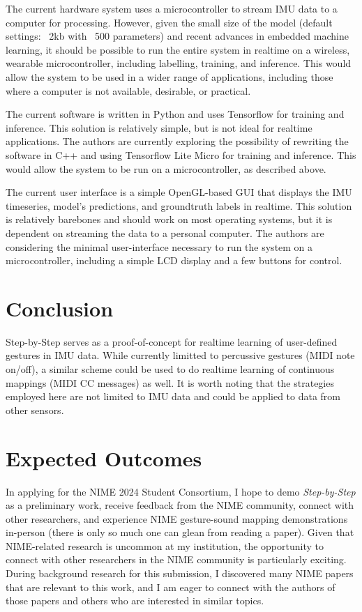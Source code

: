 \documentclass{nime-alternate} %
\begin{document}
The current hardware system uses a microcontroller to stream IMU data to a computer for processing. However, given the small size of the model (default settings: ~2kb with ~500 parameters) and recent advances in embedded machine learning, it should be possible to run the entire system in realtime on a wireless, wearable microcontroller, including labelling, training, and inference. This would allow the system to be used in a wider range of applications, including those where a computer is not available, desirable, or practical. 

The current software is written in Python and uses Tensorflow for training and inference. This solution is relatively simple, but is not ideal for realtime applications. The authors are currently exploring the possibility of rewriting the software in C++ and using Tensorflow Lite Micro for training and inference. This would allow the system to be run on a microcontroller, as described above.

The current user interface is a simple OpenGL-based GUI that displays the IMU timeseries, model's predictions, and groundtruth labels in realtime. This solution is relatively barebones and should work on most operating systems, but it is dependent on streaming the data to a personal computer. The authors are considering the minimal user-interface necessary to run the system on a microcontroller, including a simple LCD display and a few buttons for control.


\section{Conclusion}
Step-by-Step serves as a proof-of-concept for realtime learning of user-defined gestures in IMU data. While currently limitted to percussive gestures (MIDI note on/off), a similar scheme could be used to do realtime learning of continuous mappings (MIDI CC messages) as well. It is worth noting that the strategies employed here are not limited to IMU data and could be applied to data from other sensors.


\section{Expected Outcomes}
In applying for the NIME 2024 Student Consortium, I hope to demo \textit{Step-by-Step} as a preliminary work, receive feedback from the NIME community, connect with other researchers, and experience NIME gesture-sound mapping demonstrations in-person (there is only so much one can glean from reading a paper). Given that NIME-related research is uncommon at my institution, the opportunity to connect with other researchers in the NIME community is particularly exciting. During background research for this submission, I discovered many NIME papers that are relevant to this work, and I am eager to connect with the authors of those papers and others who are interested in similar topics.
\end{document}
